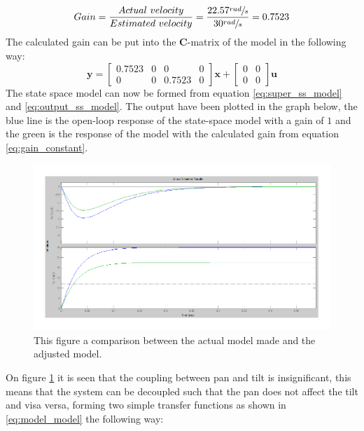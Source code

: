 \begin{equation}
	Gain = \frac{Actual\ velocity}{Estimated\ velocity} = \frac{22.57\sfrac{rad}{s}}{30\sfrac{rad}{s}} = 0.7523\label{eq:gain_constant}
\end{equation}
The calculated gain can be put into the \textbf{C}-matrix of the model in the following way:
\begin{equation}
 \textbf{y} =
 \begin{bmatrix}
   0.7523 & 0 & 0 & 0\\
   0 & 0 & 0.7523 & 0
 \end{bmatrix}
 \textbf{x} +
 \begin{bmatrix}
   0 & 0\\
   0 & 0
 \end{bmatrix}
 \textbf{u}\label{eq:output_ss_model}
\end{equation}
The state space model can now be formed from equation \ref{eq:super_ss_model} and \ref{eq:output_ss_model}. The output have been plotted in the graph below, the blue line is the open-loop response of the state-space model with a gain of $1$ and the green is the response of the model with the calculated gain from equation \ref{eq:gain_constant}.
\begin{figure}[htb]
	\centering
	\includegraphics[width=\textwidth,trim=0 0 0 0]{graphics/ZoomOpenLoop.pdf} %
	\caption{This figure a comparison between the actual model made and the adjusted model.}
	\label{fig:zoom_step}			%
\end{figure}
On figure \ref{fig:zoom_step} it is seen that the coupling between pan and tilt is insignificant, this means that the system can be decoupled such that the pan does not affect the tilt and visa versa, forming two simple transfer functions as shown in \ref{eq:model_model} the following way:
